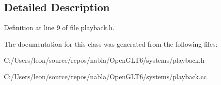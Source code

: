\subsection{Detailed Description}


Definition at line 9 of file playback.\+h.



The documentation for this class was generated from the following files\+:\begin{DoxyCompactItemize}
\item 
C\+:/\+Users/leon/source/repos/nabla/\+Open\+G\+L\+T6/systems/playback.\+h\item 
C\+:/\+Users/leon/source/repos/nabla/\+Open\+G\+L\+T6/systems/playback.\+cc\end{DoxyCompactItemize}
